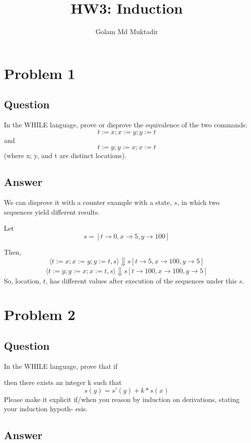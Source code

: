 \documentclass[a4paper, 11pt]{article}
\title{HW3: Induction}
\author{Golam Md Muktadir}
\begin{document}
\maketitle

\section{Problem 1}
\subsection{Question}
In the WHILE language, prove or disprove the equivalence of the two commands:
$$t := x; x := y; y := t$$
and
$$t := y; y := x; x := t$$
(where x; y, and t are distinct locations).
\subsection{Answer}
We can disprove it with a counter example with a state, $s$, in which two sequences 
yield different results.

Let 
$$s = [t\rightarrow0, x\rightarrow5, y\rightarrow100]$$

Then,
$$ \langle t := x; x := y; y := t, s \rangle \Downarrow s[t\rightarrow5, x\rightarrow100, y\rightarrow5] $$
$$ \langle t := y; y := x; x := t, s \rangle \Downarrow s[t\rightarrow100, x\rightarrow100, y\rightarrow5] $$
So, location, $t$, has different values after execution of the sequences under this $s$.

\section{Problem 2}
\subsection{Question}
In the WHILE language, prove that if

\begin{prooftree}
\end{prooftree}
then there exists an integer k such that
  $$s(y) = s'(y) + k * s(x)$$
Please make it explicit if/when you reason by induction on derivations, stating your induction hypoth-
esis.

\subsection{Answer}
\end{document}
